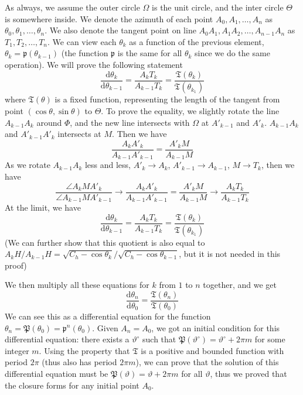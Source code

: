 \documentclass[]{article}
\newcommand{\ud}{\mathrm{d}}
\begin{document}
As always, we assume the outer circle $\Omega$ is the unit circle, and the inter circle $\Theta$ is somewhere inside. We denote the azimuth of each point $A_0, A_1,\dots,A_n$ as $\theta_0,\theta_1,\dots,\theta_n$. We also denote the tangent point on line $A_0A_1, A_1A_2,\dots,A_{n-1}A_n$ as $T_1, T_2,\dots, T_n$. We can view each $\theta_k$ as a function of the previous element, $\theta_k=\mathfrak{p}(\theta_{k-1})$ (the function $\mathfrak{p}$ is the same for all $\theta_k$ since we do the same operation). We will prove the following statement
\[
\frac{\ud \theta_{k}}{\ud \theta_{k-1}} = \frac{A_kT_k}{A_{k-1}T_{k}} = \frac{\mathfrak{T}(\theta_{k})}{\mathfrak{T}(\theta_{k_1})}
\]
where $\mathfrak{T}(\theta)$ is a fixed function, representing the length of the tangent from point $(\cos\theta, \sin\theta)$ to $\Theta$. To prove the equality, we slightly rotate the line $A_{k-1} A_k$ around $\Phi$, and the new line intersects with $\Omega$ at $A'_{k-1}$ and $A'_k$. $A_{k-1} A_k$ and $A'_{k-1} A'_k$ intersects at $M$. Then we have
\[
\frac{A_k A'_k}{A_{k-1}A'_{k-1}} = \frac{A'_{k}M}{A_{k-1}M}
\]
As we rotate $A_{k-1} A_k$ less and less, $A'_k \to A_k$, $A'_{k-1} \to A_{k-1}$, $M\to T_k$, then we have
\[
\frac{\angle A_k M  A'_k}{\angle A_{k-1} M A'_{k-1}} \to \frac{A_k A'_k}{A_{k-1}A'_{k-1}} = \frac{A'_{k}M}{A_{k-1}M} \to \frac{A_{k}T_k}{A_{k-1}T_k}
\]
At the limit, we have
\[
\frac{\ud \theta_{k}}{\ud \theta_{k-1}} = \frac{A_kT_k}{A_{k-1}T_{k}} =  \frac{\mathfrak{T}(\theta_{k})}{\mathfrak{T}(\theta_{k_1})}
\]
(We can further show that this quotient is also equal to $A_kH/A_{k-1}H = \sqrt{C_h-\cos\theta_k}/\sqrt{C_h-\cos\theta_{k-1}}$, but it is not needed in this proof)

We then multiply all these equations for $k$ from $1$ to $n$ together, and we get
\[
\frac{\ud \theta_{n}}{\ud \theta_{0}}  = \frac{\mathfrak{T}(\theta_{n})}{\mathfrak{T}(\theta_{0})}
\]
We can see this as a differential equation for the function $\theta_n = \mathfrak{P}(\theta_0) =\mathfrak{p}^n(\theta_0)$. Given $A_n = A_0$, we got an initial condition for this differential equation: there exists a $\vartheta^\circ$ such that $\mathfrak{P}(\vartheta^\circ) = \vartheta^\circ + 2\pi m$ for some integer $m$. Using the property that $\mathfrak{T}$ is a positive and bounded function with period $2\pi$ (thus also has period $2\pi m$), we can prove that the solution of this differential equation must be $\mathfrak{P}(\vartheta) = \vartheta + 2\pi m$ for all $\vartheta$, thus we proved that the closure forms for any initial point $A_0$.
 
\end{document}
